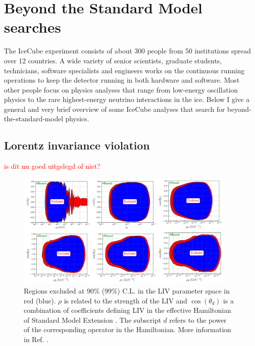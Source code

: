 \section{Beyond the Standard Model searches}
The IceCube experiment consists of about 300 people from 50 institutions spread over 12 countries. A wide variety of senior scientists, graduate students, technicians, software specialists and engineers works on the continuous running operations to keep the detector running in both hardware and software. Most other people focus on physics analyses that range from low-energy oscillation physics to the rare highest-energy neutrino interactions in the ice. Below I give a general and very brief overview of some IceCube analyses that search for beyond-the-standard-model physics.

\subsection{Lorentz invariance violation}
\textcolor{red}{is dit  nu goed uitgelegd of niet?}
\begin{figure}[ht]
\centering
\includegraphics[width=0.95\textwidth]{chapter5/img/LV.png}
\caption{Regions excluded at 90\% (99\%) C.L. in the LIV parameter space in red (blue). $\rho$ is related to the strength of the LIV and $\cos \left(\theta_d\right)$ is a combination of coefficients defining LIV in the effective Hamiltonian of Standard Model Extension \cite{Colladay:1998fq}. The subscript $d$ refers to the power of the corresponding operator in the Hamiltonian. More information in Ref. \cite{Aartsen:2017ibm}.}
\label{fig:lv}
\end{figure}

